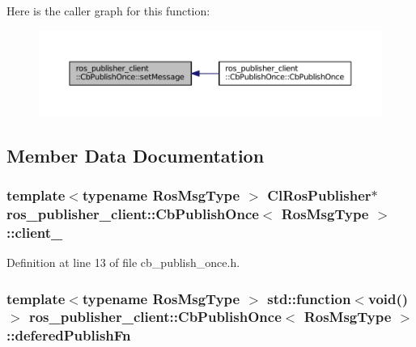 Here is the caller graph for this function\+:
\nopagebreak
\begin{figure}[H]
\begin{center}
\leavevmode
\includegraphics[width=350pt]{classros__publisher__client_1_1CbPublishOnce_a06bef500e116390ee85a790401e600d8_icgraph}
\end{center}
\end{figure}




\subsection{Member Data Documentation}
\subsubsection[{\texorpdfstring{client\+\_\+}{client_}}]{\setlength{\rightskip}{0pt plus 5cm}template$<$typename Ros\+Msg\+Type $>$ {\bf Cl\+Ros\+Publisher}$\ast$ {\bf ros\+\_\+publisher\+\_\+client\+::\+Cb\+Publish\+Once}$<$ Ros\+Msg\+Type $>$\+::client\+\_\+\hspace{0.3cm}{\ttfamily [private]}}\hypertarget{classros__publisher__client_1_1CbPublishOnce_a50a1b2a4892ad780406231e0f870746a}{}\label{classros__publisher__client_1_1CbPublishOnce_a50a1b2a4892ad780406231e0f870746a}


Definition at line 13 of file cb\+\_\+publish\+\_\+once.\+h.

\subsubsection[{\texorpdfstring{defered\+Publish\+Fn}{deferedPublishFn}}]{\setlength{\rightskip}{0pt plus 5cm}template$<$typename Ros\+Msg\+Type $>$ std\+::function$<$void()$>$ {\bf ros\+\_\+publisher\+\_\+client\+::\+Cb\+Publish\+Once}$<$ Ros\+Msg\+Type $>$\+::defered\+Publish\+Fn\hspace{0.3cm}{\ttfamily [private]}}\hypertarget{classros__publisher__client_1_1CbPublishOnce_a91e0e3d574d25e160bcb3a4ca81bb0b2}{}\label{classros__publisher__client_1_1CbPublishOnce_a91e0e3d574d25e160bcb3a4ca81bb0b2}


